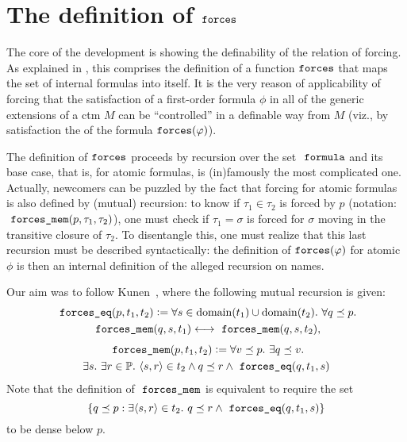 \section{The definition of $\mathop{\mathtt{forces}}$}
\label{sec:definition-forces}

The core of the development is showing the definability of the
relation of forcing. As explained in
\cite[Sect.~8]{2019arXiv190103313G}, this comprises the 
definition of a function $\mathop{\mathtt{forces}}$ that maps the set of internal
formulas into itself. It is the very reason of applicability of
forcing that the satisfaction of a first-order formula  $\phi$ in all of the generic
extensions of a ctm $M$ can be ``controlled'' in a definable way from
$M$ (viz., by  satisfaction the of the formula $\mathop{\mathtt{forces}}(\varphi)$).

The definition of $\mathop{\mathtt{forces}}$ proceeds by recursion
over the set $\formula$ and its base case, that is, for
atomic formulas, is (in)famously the most complicated one. Actually,
newcomers can be puzzled by the fact that forcing for atomic
formulas is also defined by (mutual) recursion: to know if $\tau_1\in\tau_2$ is
forced by $p$ (notation: $\forcesmem(p,\tau_1,\tau_2)$), one must check if $\tau_1=\sigma$ is forced for $\sigma$
moving in the transitive closure of $\tau_2$. To disentangle this, one
must realize that this last recursion must be described syntactically:
the definition of $\mathop{\mathtt{forces}}(\varphi)$ for atomic $\phi$ is then an
internal definition of the alleged recursion on names. 

Our aim was to follow Kunen~\cite[p.~257]{kunen2011set}, where the
following mutual recursion is given:
\begin{multline}\label{eq:def-forcing-equality}
  \forceseq (p,t_1,t_2) \defi 
  \forall s\in\dom(t_1)\cup\dom(t_2).\ \forall q\pleq p .\\
  \forcesmem(q,s,t_1)\lsii 
  \forcesmem(q,s,t_2),
\end{multline}
\begin{multline}\label{eq:def-forcing-membership}
  \forcesmem(p,t_1,t_2) \defi  \forall v\pleq p. \ \exists q\pleq v. \\
  \exists s.\ \exists r\in \PP .\ \lb s,r\rb \in
      t_2 \land q \pleq r \land \forceseq(q,t_1,s)
\end{multline}
Note that the definition of $\forcesmem$ is equivalent to require 
 the set 
\[
\{q\pleq p : \exists \lb s,r\rb\in t_2 . \ q\pleq r \land \forceseq(q,t_1,s)\}
\]
to be dense below $p$.

